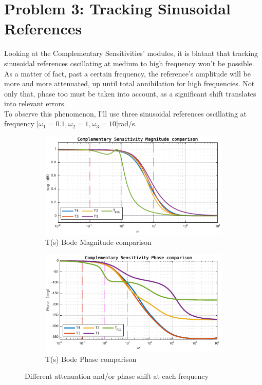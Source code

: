 \documentclass[a4paper, 12pt]{article}
\begin{document}
\section{Problem 3: Tracking Sinusoidal References}
Looking at the Complementary Sensitivities' modules, it is blatant that tracking sinusoidal references oscillating at medium to high frequency won't be possible. \\As a matter of fact, past a certain frequency, the reference's amplitude will be more and more attenuated, up until total annihilation for high frequencies. Not only that, phase too must be taken into account, as a significant shift translates into relevant errors.
\\To observe this phenomenon, I'll use three sinusoidal references oscillating at frequency [$\omega_1 = 0.1, \omega_2 = 1, \omega_3 = 10$]rad/s.
\begin{figure}[h!]

    \begin{subfigure}[t]{0.50\textwidth}
           \includegraphics[width=\textwidth]{Figures/fig08a.pdf}
           \caption{T(s) Bode Magnitude comparison}
           \label{fig:fig08a}
       \end{subfigure}
    \begin{subfigure}[t]{0.5\textwidth}
           \includegraphics[width=\textwidth]{Figures/fig08b.pdf}
           \caption{T(s) Bode Phase comparison}
           \label{fig:fig08b}
       \end{subfigure}
       \caption{Different attenuation and/or phase shift at each frequency}
    \label{fig:fig08}
   \end{figure}
\end{document}
